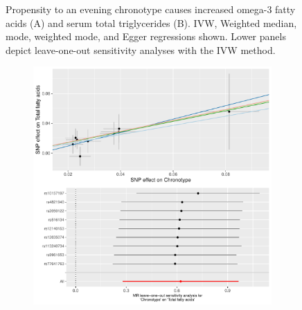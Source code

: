 \documentclass[journal,article,submit,moreauthors,pdftex]{Definitions/mdpi}
\begin{document}
\begin{figure}[htbp]
\begin{subfigure}[b]{0.4\textwidth}
         \caption{}
         \label{totalTG}
     \end{subfigure}
        \caption{Propensity to an evening chronotype causes increased omega-3 fatty acids (A) and serum total triglycerides (B). IVW, Weighted median, mode, weighted mode, and Egger regressions shown. Lower panels depict leave-one-out sensitivity analyses with the IVW method.}
        \label{omega3tgs}
\end{figure}

\begin{figure}[htbp]
     \centering
     \begin{subfigure}[b]{0.4\textwidth}
         \centering
         \includegraphics[width=\textwidth]{Figs/Analysis2/Chronotype_vs_Total_fatty_acids.Plots.pdf}
         \caption{}
         \label{tffa}
     \end{subfigure}
     \begin{subfigure}[b]{0.4\textwidth}
         \centering

\end{subfigure}
\end{figure}
\end{document}
